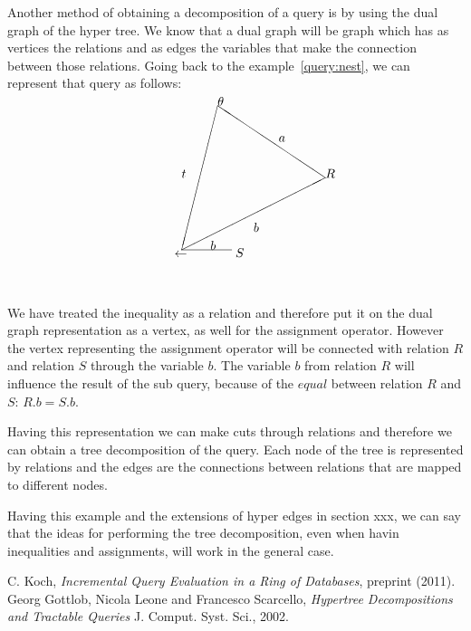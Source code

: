 \documentclass[12pt]{article}
\begin{document}
Another method of obtaining a decomposition of a query is by using the dual graph of the hyper tree. We know that a dual graph will be graph which has as vertices the relations and as edges the variables that make the connection between those relations. Going back to the example~\ref{query:nest}, we can represent that query as follows:

\begin{align}
\label{hyper3}
\setlength{\unitlength}{1mm}
\begin{picture}(50,50)
\put(50,30){\line(-3,2){30}}
\put(20,50){\line(-1,-4){10}}
\put(10,10){\line(2,1){40}}
\put(10,10){\line(5,0){14}}
\put(50,30){$R$}
\put(20,50){$\theta$}
\put(8,8){$\gets$}
\put(25,8){$S$}
\put(30,15){$b$}
\put(37,40){$a$}
\put(10,30){$t$}
\put(18,10){$b$}
\end{picture}
\end{align}

We have treated the inequality as a relation and therefore put it on the dual graph representation as a vertex, as well for the assignment operator. However the vertex representing the assignment operator will be connected with relation $R$ and relation $S$ through the variable $b$. The variable $b$ from relation $R$ will influence the result of the sub query, because of the $equal$ between relation $R$ and $S$: $R.b=S.b$.

Having this representation we can make cuts through relations and therefore we can obtain a tree decomposition of the query. Each node of the tree is represented by relations and the edges are the connections between relations that are mapped to different nodes.

Having this example and the extensions of hyper edges in section xxx, we can say that the ideas for performing the tree decomposition, even when havin inequalities and assignments, will work in the general case. 

\begin{thebibliography}{9}
 C. Koch, \emph{Incremental Query Evaluation in a Ring of Databases},  preprint (2011).
 Georg Gottlob, Nicola Leone and Francesco Scarcello, \emph{Hypertree Decompositions and Tractable Queries} J. Comput. Syst. Sci., 2002.
\end{thebibliography}
\end{document}
